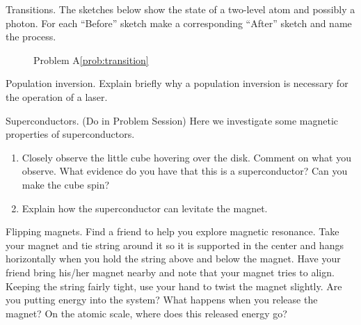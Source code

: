 \newpage

\begin{aproblem}{Transitions.}  
  The sketches below show the state of a two-level atom and possibly a
  photon.  For each ``Before'' sketch make a corresponding ``After''
  sketch and name the process.
  \label{prob:transition}

  \begin{figure}[h]
    \begin{center}
      \caption{Problem A\ref{prob:transition}}
    \end{center}
  \end{figure}
\end{aproblem}


\begin{aproblem}{Population inversion.} 
  Explain briefly why a population inversion is necessary for the
  operation of a laser.
\end{aproblem}


\begin{aproblem}{Superconductors.} 
  (Do in Problem Session) Here we investigate some magnetic properties
  of superconductors.
  \begin{enumerate} 
  \item Closely observe the little cube hovering over the
    disk. Comment on what you observe.  What evidence do you have that
    this is a superconductor?  Can you make the cube spin?
  \item Explain how the superconductor can levitate the magnet.
  \end{enumerate}
\end{aproblem}


\begin{aproblem}{Flipping magnets.} 
  Find a friend to help you explore magnetic resonance. Take your
  magnet and tie string around it so it is supported in the center and
  hangs horizontally when you hold the string above and below the
  magnet.  Have your friend bring his/her magnet nearby and note that
  your magnet tries to align.  Keeping the string fairly tight, use
  your hand to twist the magnet slightly. Are you putting energy into
  the system?  What happens when you release the magnet?  On the
  atomic scale, where does this released energy go?
\end{aproblem}


